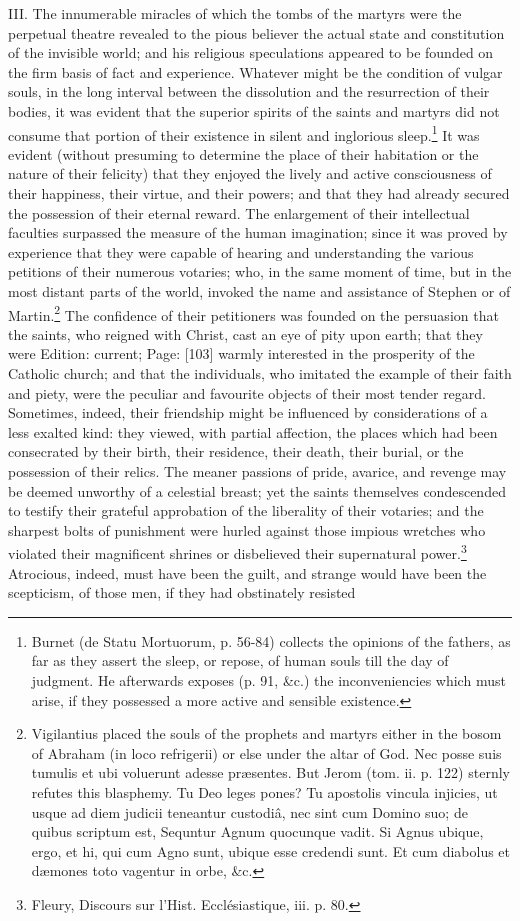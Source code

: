 III. The innumerable miracles of which the tombs of the martyrs were the perpetual theatre revealed to the pious believer the actual state and constitution of the invisible world; and his religious speculations appeared to be founded on the firm basis of fact and experience. Whatever might be the condition of vulgar souls, in the long interval between the dissolution and the resurrection of their bodies, it was evident that the superior spirits of the saints and martyrs did not consume that portion of their existence in silent and inglorious sleep.\footnote{Burnet (de Statu Mortuorum, p. 56-84) collects the opinions of the fathers, as far as they assert the sleep, or repose, of human souls till the day of judgment. He afterwards exposes (p. 91, \&c.) the inconveniencies which must arise, if they possessed a more active and sensible existence.} It was evident (without presuming to determine the place of their habitation or the nature of their felicity) that they enjoyed the lively and active consciousness of their happiness, their virtue, and their powers; and that they had already secured the possession of their eternal reward. The enlargement of their intellectual faculties surpassed the measure of the human imagination; since it was proved by experience that they were capable of hearing and understanding the various petitions of their numerous votaries; who, in the same moment of time, but in the most distant parts of the world, invoked the name and assistance of Stephen or of Martin.\footnote{Vigilantius placed the souls of the prophets and martyrs either in the bosom of Abraham (in loco refrigerii) or else under the altar of God. Nec posse suis tumulis et ubi voluerunt adesse præsentes. But Jerom (tom. ii. p. 122) sternly refutes this blasphemy. Tu Deo leges pones? Tu apostolis vincula injicies, ut usque ad diem judicii teneantur custodiâ, nec sint cum Domino suo; de quibus scriptum est, Sequntur Agnum quocunque vadit. Si Agnus ubique, ergo, et hi, qui cum Agno sunt, ubique esse credendi sunt. Et cum diabolus et dæmones toto vagentur in orbe, \&c.} The confidence of their petitioners was founded on the persuasion that the saints, who reigned with Christ, cast an eye of pity upon earth; that they were Edition: current; Page: [103] warmly interested in the prosperity of the Catholic church; and that the individuals, who imitated the example of their faith and piety, were the peculiar and favourite objects of their most tender regard. Sometimes, indeed, their friendship might be influenced by considerations of a less exalted kind: they viewed, with partial affection, the places which had been consecrated by their birth, their residence, their death, their burial, or the possession of their relics. The meaner passions of pride, avarice, and revenge may be deemed unworthy of a celestial breast; yet the saints themselves condescended to testify their grateful approbation of the liberality of their votaries; and the sharpest bolts of punishment were hurled against those impious wretches who violated their magnificent shrines or disbelieved their supernatural power.\footnote{Fleury, Discours sur l\texthebrew{}’Hist. Ecclésiastique, iii. p. 80.} Atrocious, indeed, must have been the guilt, and strange would have been the scepticism, of those men, if they had obstinately resisted 